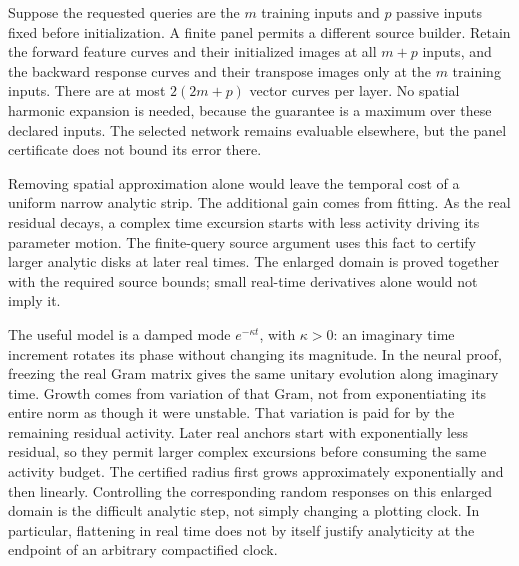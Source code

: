 Suppose the requested queries are the $m$ training inputs and $p$ passive
inputs fixed before initialization. A finite panel permits a different
source builder. Retain the forward feature curves and their initialized
images at all $m+p$ inputs, and the backward response curves and their
transpose images only at the $m$ training inputs. There are at most
$2(2m+p)$ vector curves per layer. No spatial harmonic expansion is
needed, because the guarantee is a maximum over these declared inputs.
The selected network remains evaluable elsewhere, but the panel certificate
does not bound its error there.

Removing spatial approximation alone would leave the temporal cost of a
uniform narrow analytic strip. The additional gain comes from fitting.
As the real residual decays, a complex time excursion starts with less
activity driving its parameter motion. The finite-query source argument
uses this fact to certify larger analytic disks at later real times.
The enlarged domain is proved together with the required source bounds;
small real-time derivatives alone would not imply it.

The useful model is a damped mode $e^{-\kappa t}$, with $\kappa>0$:
an imaginary time increment rotates its phase without changing its
magnitude. In the neural proof, freezing the real Gram matrix gives the
same unitary evolution along imaginary time. Growth comes from variation
of that Gram, not from exponentiating its entire norm as though it were
unstable. That variation is paid for by the remaining residual activity.
Later real anchors start with exponentially less residual, so they permit
larger complex excursions before consuming the same activity budget.
The certified radius first grows approximately exponentially and then
linearly. Controlling the corresponding random responses on this enlarged
domain is the difficult analytic step, not simply changing a plotting clock.
In particular, flattening in real time does not by itself justify analyticity
at the endpoint of an arbitrary compactified clock.


